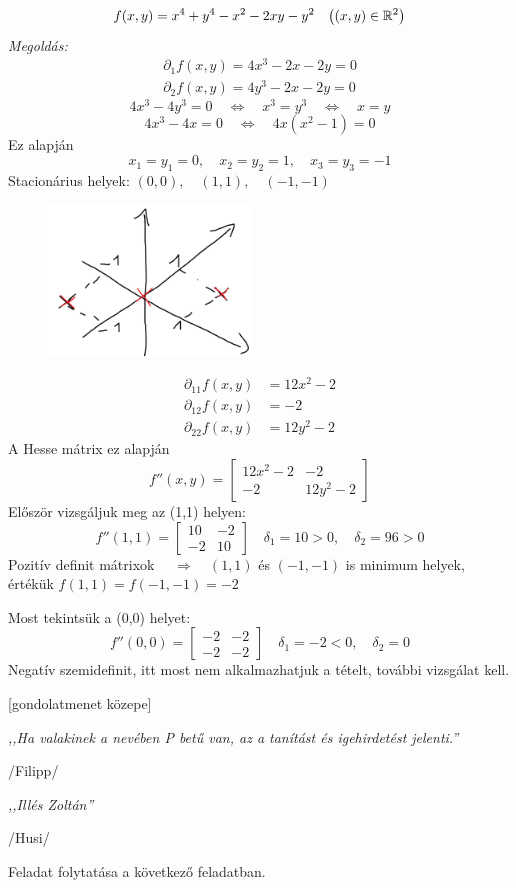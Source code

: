 \documentclass[a4paper,11.5pt]{article}
\begin{document}
	\begin{task}
		\[ f(x,y)=x^4+y^4-x^2-2xy-y^2\quad \big((x,y)\in\mathbb{R}^2\big) \]
		\textit{Megoldás:}
		\begin{align*}
			\partial_1f(x,y)=4x^3-2x-2y=0\\
			\partial_2f(x,y)=4y^3-2x-2y=0
		\end{align*}
		\[ 4x^3-4y^3=0\quad \Leftrightarrow\quad x^3=y^3\quad \Leftrightarrow\quad x=y \]
		\[ 4x^3-4x=0\quad \Leftrightarrow\quad 4x(x^2-1)=0 \]
		Ez alapján
		\[x_1=y_1=0,\quad x_2=y_2=1,\quad x_3=y_3=-1\]
		Stacionárius helyek: $(0,0),\quad (1,1),\quad (-1,-1)$
		\begin{figure}[H]
			\centering
			\includegraphics[height=4cm]{../2zh/kepek/40.png}
			\caption{}
		\end{figure}
		\vspace{-9mm}
		\begin{align*}
			\partial_{11}f(x,y)&=12x^2-2\\
			\partial_{12}f(x,y)&=-2\\	
			\partial_{22}f(x,y)&=12y^2-2
		\end{align*}
		A Hesse mátrix ez alapján
		\[ f''(x,y)=\begin{bmatrix}
			12x^2-2&-2\\
			-2&12y^2-2
		\end{bmatrix} \]
		Először vizsgáljuk meg az (1,1) helyen:
		\[ f''(1,1)=\begin{bmatrix}
			10&-2\\
			-2&10
		\end{bmatrix}\quad \delta_1=10>0,\quad \delta_2=96>0 \] 
		Pozitív definit mátrixok $\quad \Rightarrow\quad (1,1)$ és $(-1,-1)$ is minimum helyek, értékük $f(1,1)=f(-1,-1)=-2$
		
		Most tekintsük a (0,0) helyet:
		\[ f''(0,0)=\begin{bmatrix}
			-2&-2\\
			-2&-2
		\end{bmatrix}\quad \delta_1=-2<0,\quad \delta_2=0 \]
		Negatív szemidefinit, itt most nem alkalmazhatjuk a tételt, további vizsgálat kell.
		\begin{center}
			[gondolatmenet közepe]
			\smallskip
			
			\textit{,,Ha valakinek a nevében P betű van, az a tanítást és igehirdetést jelenti.''}
			
			/Filipp/
			\medskip
			
			\textit{,,Illés Zoltán''}
			
			/Husi/
		\end{center}
		Feladat folytatása a következő feladatban.
	\end{task}
\end{document}
